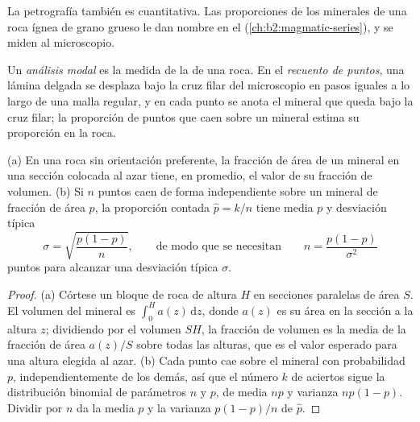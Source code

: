 La petrografía también es cuantitativa. Las proporciones de los minerales de una roca ígnea de grano grueso
le dan nombre en el  (\cref{ch:b2:magmatic-series}), y se miden al
microscopio.

\begin{definition}\label{def:b2:field-lab-methods-2:modal}
Un \emph{análisis modal} es la medida de la  de una
roca. En el \emph{recuento de puntos}, una lámina
delgada se desplaza bajo la cruz filar del microscopio en pasos iguales a lo largo de una malla regular, y
en cada punto se anota el mineral que queda bajo la cruz filar; la proporción de puntos que
caen sobre un mineral estima su proporción en la roca.
\end{definition}

\begin{proposition}\label{prop:b2:field-lab-methods-2:counting}
(a) En una roca sin orientación preferente, la fracción de área de un mineral en una sección colocada
al azar tiene, en promedio, el valor de su fracción de volumen. (b) Si $n$ puntos caen de forma independiente
sobre un mineral de fracción de área $p$, la proporción contada $\hat p = k/n$ tiene media $p$ y desviación
típica
\begin{equation}
\sigma = \sqrt{\frac{p(1-p)}{n}} , \qquad\text{de modo que se necesitan}\qquad n = \frac{p(1-p)}{\sigma^2}
\label{eq:b2:field-lab-methods-2:binomial}
\end{equation}
puntos para alcanzar una desviación típica $\sigma$.
\end{proposition}

\begin{proof}
(a) Córtese un bloque de roca de altura $H$ en secciones paralelas de área $S$. El volumen del
mineral es $\int_0^H a(z)\,\mathrm{d}z$, donde $a(z)$ es su área en la sección a la altura $z$;
dividiendo por el volumen $SH$, la fracción de volumen es la media de la fracción de área $a(z)/S$ sobre
todas las alturas, que es el valor esperado para una altura elegida al azar. (b) Cada punto cae sobre el
mineral con probabilidad $p$, independientemente de los demás, así que el número $k$ de aciertos sigue la
distribución binomial de parámetros $n$ y $p$, de media $np$ y varianza $np(1-p)$. Dividir por
$n$ da la media $p$ y la varianza $p(1-p)/n$ de $\hat p$.
\end{proof}


